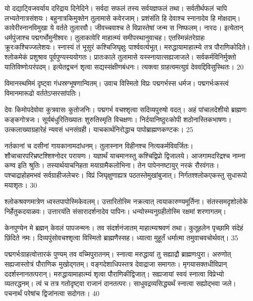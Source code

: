 यो दद्याट्विजवर्याय दरिद्राय दिनेदिने।
 सर्वदा सफलं तस्य सर्वयज्ञफलं तथा।
 सर्वतीर्थफलं चापि लभ्यतेनात्रसंशयः।
 बहुनात्रकिमुक्तेन तुलामासे कवेरजाम्।
 प्रशंसंति हि देवाश्च स्नानादेव हि मोक्षदाम्।
 कावेरीस्नानविमुखा ये वर्तते तुलारवौ।
 जीवच्चवाश्च ते विप्रास्तेषां जन्म स निष्फलम्।
 नारदः।
 इत्येतान् धर्मपुंजाश्च पद्मगर्भोमुनीश्वरः।
 तुलाकावेरि माहात्म्यं समीपस्थानुवाचह।
 एतस्मिन्नंतरेग्राहः क्रूरःकश्चिज्जलेशयः।
 स्नास्यं तं भूसुरं कश्चिजिघृक्षुः पार्श्ववर्त्यभूत्।
 मरुद्धायामाहात्म्ये तत्र पौराणिकोदिते।
 श्लोकमेकं प्रशुश्राव पूर्वपुण्यस्ययोगतः।
 प्रातःकाले तुलामासे यस्स्नायात्सह्यजाजले।
 सर्वकर्मविनिर्मुक्तो यातिविष्णोःपरंपदम्।
 इत्येतद्वचनं शृत्वा सद्यस्संक्षीणबंधनः।
 त्यक्त्वा ग्राहत्वमत्युग्रं देववद्दिविसुस्थितः।
 20

  विमानस्थमिमं दृष्ट्वा गंधस्रग्भूषणान्वितम्।
 उवाच विस्मितो विप्रः पद्मगर्भस्स धर्मज।
 पद्मगर्भःकस्त्वं विमानमारूढो वर्ततेऽप्सरसांपतिः।
 
देवः किमोपदेवोवा कुत्रवासः कुतोजनिः।
 पद्मगर्भ वचश्शृत्वा सदिव्यपुरुषो वदत्।
 अहं पांचालदेशीयो ब्राह्मणः कङ्कगोत्रजः।
 सूर्यबंधुरितिख्यातः शुरुतिस्मृति विचक्षणः।
 निर्दयानिष्ठुरःकोपी शठोनास्तिकभाषणः।
 उत्कलाख्याग्रहारेहं न्यवसं धनसंग्रही।
 याचकार्थनिरोद्धाच पापोब्राह्मणकण्टकः।
 25

  नर्तकानां च दसीनां गायकानामदांधनम्।
 तुलास्नान विहीनश्च नित्यकर्मविवर्जितः।
 शौचाचारपरिभ्रष्टश्शिश्नोदर परायणः।
 यज्ञार्थं याचमानस्तु कश्चिद्विप्रो द्विजालये।
 आजगामदरिद्रश्च नाम्ना कण्व इति श्रुतिः।
 तस्यार्थयाचनिहता मयाग्रामैकलोभिना।
 तेन पापेननष्टायुर् नरकं रौरवंगतः।
 पश्चाद्राहोहमभवं सर्वग्राहीजलेचरः।
 विप्रं जिघृक्षुणाह्यत्र पठतस्तेमुखांबुजात्।
 निर्गतश्श्लोकएकस्तु सुधारूपो मयाशृतः।
 30

  श्लोकश्रवणमात्रेण ध्वस्तपापोस्मिकेवलम्।
 उत्तारितोस्मि नक्रत्वात् त्वयाकारुण्यमूर्तिना।
 संतस्समदृशोलोके निर्हेतुकदयाळवः।
 उत्तारयंति संसारादर्शनादेव पापिनः।
 धन्योस्म्यनुग्रहीतोस्मि रक्षमां शरणागतम्।
 
केनपुण्येन मे ब्रह्मन् केवलं पापजन्मनः।
 तव संदर्शनंजातम् माहात्म्यश्रवणं तथा।
 कुतूहलेन पृच्छामि संदेहं छिंदिते नमः।
 दिव्यपुंसोवचश्शृत्वा विस्मितो ब्राह्मणैस्सह।
 ध्यात्वा मुहूर्तं धर्मात्मा तमुवाचवचोर्थवत्।
 35

  पद्मगर्भःग्राहत्वोत्तारकं पुण्यम् तव वच्मिपुरातनम्।
 स्नात्वा मरुद्धायां तु सह्याद्रौ ब्राह्मणःपुरा।
 अरुणोत् सह्यजास्तोत्रं पौराणिक मुखोद्गतम्।
 वङ्गदेशाधिपस्तत्र देवाद्राजा समागतः।
 मृगयासक्तधीविप्रान् ददर्शस्नानतत्परान्।
 मरुद्धायामाहात्म्यं शृत्वा पौराणिकीद्विजात्।
 सह्यजायां स्वयं स्नात्वा विप्रेभ्यो व्यतरद्धनम्।
 त्वं च तत्र गतोदृष्ट्वा राजानं दानतत्परः।
 साधुवद्रव्यसिद्ध्यर्थं स्नात्वा सह्योद्भवा जले।
 पचनार्थं परेषांच द्विजांनत्वा सदोगतः।
 40

